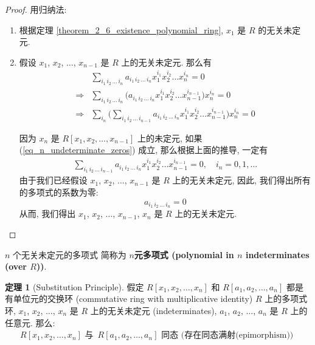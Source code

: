\documentclass[utf8]{ctexbook}
\theoremstyle{definition}
\newtheorem{prototheorem}{定理}[section]
\newenvironment{theorem}
   {\colorlet{shadecolor}{red!30}\begin{shaded}\begin{prototheorem}}
   {\end{prototheorem}\end{shaded}}
\begin{document}
\begin{proof}
用归纳法: 

\begin{enumerate}
\item{根据定理 \ref{theorem_2_6_existence_polynomial_ring},  $x_1$ 是 $R$ 的无关未定元.}
\item{假设 $x_1$, $x_2$, $\ldots$, $x_{n-1}$ 是 $R$ 上的无关未定元. 那么有
\begin{align}
& \sum_{i_1 \, i_2 \, \ldots \, i_n} a_{i_1 \, i_2 \, \ldots \, i_n} x_1 ^{i_1} x_2 ^{i_2} \ldots x_n ^{i_n} = 0 \label{eq_n_undeterminate_zeros}\\
\Rightarrow & \sum_{i_1 \, i_2 \, \ldots \, i_n} \big( a_{i_1 \, i_2 \, \ldots \, i_n} x_1 ^{i_1} x_2 ^{i_2} \ldots  x_{n-1} ^{i_{n-1} } \big) x_n ^{i_n} = 0 \nonumber \\
\Rightarrow & \sum_{i_n} \big( \sum_{i_1 \, i_2 \, \ldots \, i_{n-1} } a_{i_1 \, i_2 \, \ldots \, i_{n} } x_1 ^{i_1} x_2 ^{i_2} \ldots  x_{n-1} ^{i_{n-1} } \big) x_n ^{i_n} = 0 \nonumber 
\end{align}

因为 $x_n$ 是 $R[x_1, x_2, \ldots, x_{n-1} ]$ 上的未定元, 如果 (\ref{eq_n_undeterminate_zeros}) 成立, 那么根据上面的推导, 一定有
\begin{align*}
\sum_{i_1 \, i_2 \, \ldots \, i_{n-1} } a_{i_1 \, i_2 \, \ldots \, i_{n} } x_1 ^{i_1} x_2 ^{i_2} \ldots  x_{n-1} ^{i_{n-1} }  = 0, \quad i_n = 0, 1, \ldots
\end{align*}
由于我们已经假设 $x_1$, $x_2$, $\ldots$, $x_{n-1}$ 是 $R$ 上的无关未定元, 因此, 我们得出所有的多项式的系数为零:
\begin{equation}
a_{i_1 \, i_2 \, \ldots \, i_{n} } = 0
\end{equation}
从而, 我们得出 $x_1$, $x_2$, $\ldots$, $x_{n-1}$, $x_n$ 是 $R$ 上的无关未定元.
}
\end{enumerate}
\end{proof}

$n$ 个无关未定元的多项式 简称为 \textbf{$n$元多项式 (polynomial in $n$ indeterminates (over $R$))}.

\begin{theorem}[Substitution Principle]\label{theoream_poly_ring_substitution}
假定 $R[x_1, x_2, \ldots, x_{n} ]$ 和 $R[a_1, a_2, \ldots, a_{n} ]$ 都是有单位元的交换环 (commutative ring with multiplicative identity) $R$ 上的多项式环, $x_1$, $x_2$, $\ldots$, $x_n$ 是 $R$ 上的无关未定元 (indeterminates), $a_1$, $a_2$, $\ldots$, $a_n$ 是 $R$ 上的任意元. 那么:
\begin{align*}
R[x_1, x_2, \ldots, x_{n} ] \mbox{ 与 } \, R[a_1, a_2, \ldots, a_{n} ] \mbox{ 同态 (存在同态满射(epimorphism)) } 
\end{align*}
\end{theorem}
\end{document}
